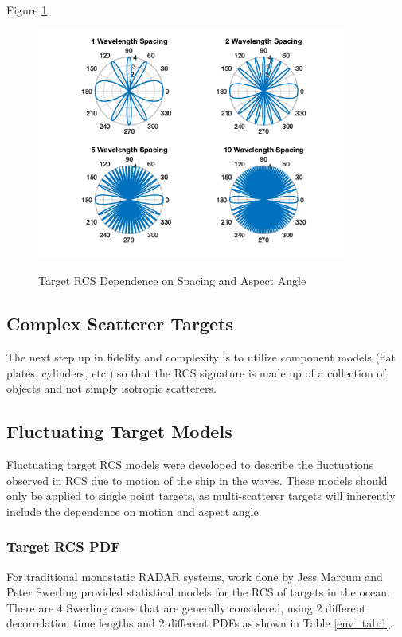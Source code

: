 Figure \ref{env_fig:3y} 
\begin{figure}[H]
  \begin{center}
\includegraphics[width=4in]{../media/multistatic/target_rcs_2_point.png}
  \end{center}
  \renewcommand{\baselinestretch}{1} \small\normalsize
  \begin{quote}
    \caption[Target RCS Dependence on Spacing and Aspect Angle]{Target RCS Dependence on Spacing and Aspect Angle\label{env_fig:3y}}
  \end{quote}
\end{figure}
\renewcommand{\baselinestretch}{2} \small\normalsize

\subsection{Complex Scatterer Targets}
The next step up in fidelity and complexity is to utilize component models (flat plates, cylinders, etc.) so that the RCS signature is made up of a collection of objects and not simply isotropic scatterers.

\subsection{Fluctuating Target Models}\label{env_fluctuating_target_rcs}
Fluctuating target RCS models were developed to describe the fluctuations observed in RCS due to motion of the ship in the waves. These models should only be applied to single point targets, as multi-scatterer targets will inherently include the dependence on motion and aspect angle.

\subsubsection{Target RCS PDF}
For traditional monostatic RADAR systems, work done by Jess Marcum and Peter Swerling provided statistical models for the RCS of targets in the ocean\cite{richards_radar}. There are $4$ Swerling cases that are generally considered, using $2$ different decorrelation time lengths and $2$ different PDFs as shown in Table \ref{env_tab:1}. 

